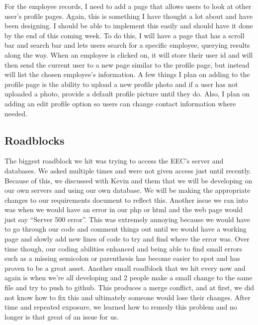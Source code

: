 \documentclass[letterpaper,10pt,titlepage,journal,compsoc,draftclsnofoot,onecolumn]{IEEEtran}
\newcommand\tab[1][1cm]{\hspace*{#1}}
\begin{document}
\tab
For the employee records, I need to add a page that allows users to look at other user’s profile pages. Again, this is something I have thought a lot about and have been designing. I should be able to implement this easily and should have it done by the end of this coming week. To do this, I will have a page that has a scroll bar and search bar and lets users search for a specific employee, querying results along the way. When an employee is clicked on, it will store their user id and will then send the current user to a new page similar to the profile page, but instead will list the chosen employee’s information. A few things I plan on adding to the profile page is the ability to upload a new profile photo and if a user has not uploaded a photo, provide a default profile picture until they do. Also, I plan on adding an edit profile option so users can change contact information where needed.
\newline


\subsection{Roadblocks}

\tab
The biggest roadblock we hit was trying to access the EEC’s server and databases. We asked multiple times and were not given access just until recently. Because of this, we discussed with Kevin and them that we will be developing on our own servers and using our own database. We will be making the appropriate changes to our requirements document to reflect this. Another issue we ran into was when we would have an error in our php or html and the web page would just say “Server 500 error”. This was extremely annoying because we would have to go through our code and comment things out until we would have a working page and slowly add new lines of code to try and find where the error was. Over time though, our coding abilities enhanced and being able to find small errors such as a missing semicolon or parenthesis has become easier to spot and has proven to be a great asset. Another small roadblock that we hit every now and again is when we’re all developing and 2 people make a small change to the same file and try to push to github. This produces a merge conflict, and at first, we did not know how to fix this and ultimately someone would lose their changes. After time and repeated exposure, we learned how to remedy this problem and no longer is that great of an issue for us.
\newline
\end{document}
